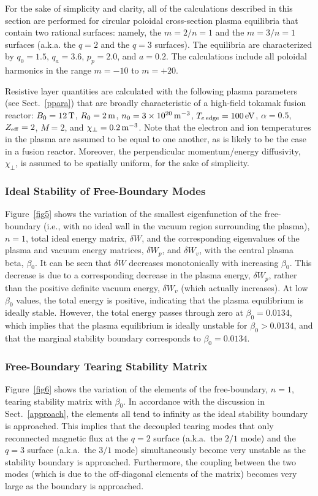 \documentclass[12pt,prb,aps]{revtex4-1}
\begin{document}
For the sake of simplicity and clarity, all of the calculations described in this section are performed for circular poloidal cross-section plasma equilibria that contain two rational surfaces: namely, the $m=2/n=1$ and the $m=3/n=1$ surfaces (a.k.a. the $q=2$ and the $q=3$ surfaces). 
The equilibria are characterized by $q_0=1.5$, $q_a=3.6$, $p_p=2.0$, and $a=0.2$. The calculations include all poloidal harmonics in the range $m=-10$ to $m=+20$. 

Resistive layer quantities are calculated with the following plasma parameters (see Sect.~\ref{ppara}) that are broadly characteristic of a high-field tokamak fusion reactor:
$B_0=12\,{\rm T}$, $R_0=2\,{\rm m}$, $n_0=3\times 10^{20}\,{\rm m}^{-3}$, $T_{e\,{\rm edge}}=100\,{\rm eV}$, $\alpha =0.5$, $Z_{\rm eff}=2$, $M=2$, 
and $\chi_\perp=0.2\,{\rm m}^{-3}$. Note that the electron and ion temperatures in the plasma are assumed to be equal to one another, as is likely to be the case in a
fusion reactor. Moreover, the
perpendicular momentum/energy diffusivity, $\chi_\perp$, is assumed to be spatially uniform, for the sake of simplicity. 

\subsubsection{Ideal Stability of Free-Boundary Modes}
Figure~\ref{fig5} shows the variation of the smallest eigenfunction of the free-boundary (i.e., with no ideal wall in the vacuum region surrounding the plasma), $n=1$, 
total ideal energy matrix, $\delta W$, and the corresponding eigenvalues of the plasma and vacuum energy matrices, $\delta W_p$, and $\delta W_v$, with the
central plasma beta, $\beta_0$. It can be seen that $\delta W$ decreases monotonically with increasing $\beta_0$. This decrease is due
to a corresponding decrease in the plasma energy, $\delta W_p$, rather than the positive definite vacuum energy, $\delta W_v$ (which actually increases). 
At low $\beta_0$ values, the total energy is positive, indicating that the plasma equilibrium is ideally stable.\cite{freidberg,ideal} However,  the
total energy passes through zero at $\beta_0=0.0134$, which implies that the plasma equilibrium is ideally unstable for $\beta_0>0.0134$,
and that the marginal stability boundary corresponds to $\beta_0=0.0134$. 

\subsubsection{Free-Boundary Tearing Stability Matrix}
Figure~\ref{fig6} shows the variation of the elements of the free-boundary, $n=1$, tearing stability matrix with $\beta_0$. In accordance with the discussion in
Sect.~\ref{approach}, the elements all tend to infinity as the ideal stability boundary is approached. This implies that the decoupled tearing modes that
only reconnected magnetic flux at the $q=2$ surface (a.k.a.\ the $2/1$ mode) and the $q=3$ surface  (a.k.a.\ the $3/1$ mode)  simultaneously become very unstable as the
stability boundary is approached. Furthermore, the coupling between the two modes (which is due to the off-diagonal elements of the matrix)
becomes very large as the  boundary is approached. 
\end{document}
